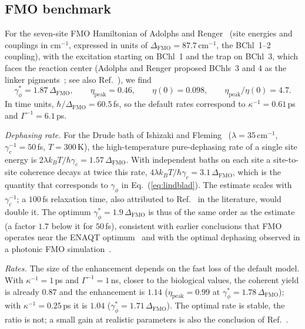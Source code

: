 \documentclass[aps,pre,preprint,floatfix]{revtex4-2}
\newcommand{\gp}{\gamma_\phi}
\newcommand{\gps}{\gamma_\phi^*}
\newcommand{\etap}{\eta_\text{peak}}
\begin{document}
\subsection{\label{sec:fmo}FMO benchmark}

For the seven-site FMO Hamiltonian of Adolphs and Renger~\cite{adolphs2006}
(site energies and couplings in cm$^{-1}$, expressed in units of
$\Delta_\text{FMO}=87.7\,\text{cm}^{-1}$, the BChl~1--2 coupling), with the
excitation starting on BChl~1 and the trap on BChl~3, which faces the
reaction center (Adolphs and Renger proposed BChls~3 and 4 as the linker
pigments~\cite{adolphs2006}; see also Ref.~\cite{rebentrost2009}), we find
\begin{equation*}
  \gps = 1.87\,\Delta_\text{FMO},\qquad
  \etap = 0.46,\qquad
  \eta(0)=0.098,\qquad
  \etap/\eta(0) = 4.7 .
\end{equation*}
In time units, $\hbar/\Delta_\text{FMO}=60.5$\,fs, so the default rates
correspond to $\kappa^{-1}=0.61$\,ps and $\Gamma^{-1}=6.1$\,ps.

\textit{Dephasing rate.}
For the Drude bath of Ishizaki and Fleming~\cite{ishizaki2009}
($\lambda=35\,\text{cm}^{-1}$, $\gamma_c^{-1}=50$\,fs, $T=300$\,K), the
high-temperature pure-dephasing rate of a single site energy is
$2\lambda k_BT/\hbar\gamma_c=1.57\,\Delta_\text{FMO}$.
With independent baths on each site a site-to-site coherence decays at twice
this rate, $4\lambda k_BT/\hbar\gamma_c=3.1\,\Delta_\text{FMO}$, which is the
quantity that corresponds to $\gp$ in Eq.~(\ref{eq:lindblad}).
The estimate scales with $\gamma_c^{-1}$; a $100$\,fs relaxation time, also
attributed to Ref.~\cite{ishizaki2009} in the literature, would double it.
The optimum $\gps=1.9\,\Delta_\text{FMO}$ is thus of the same order as the
estimate (a factor $1.7$ below it for $50$\,fs), consistent with earlier
conclusions that FMO operates near the ENAQT
optimum~\cite{rebentrost2009,caruso2009} and with the optimal dephasing
observed in a photonic FMO simulation~\cite{tang2024}.

\textit{Rates.}
The size of the enhancement depends on the fast loss of the default model.
With $\kappa^{-1}=1$\,ps and $\Gamma^{-1}=1$\,ns, closer to the biological
values, the coherent yield is already $0.87$ and the enhancement is $1.14$
($\etap=0.99$ at $\gps=1.78\,\Delta_\text{FMO}$); with $\kappa^{-1}=0.25$\,ps
it is $1.04$ ($\gps=1.71\,\Delta_\text{FMO}$).
The optimal rate is stable, the ratio is not; a small gain at realistic
parameters is also the conclusion of Ref.~\cite{zerahharush2021}.
\end{document}
